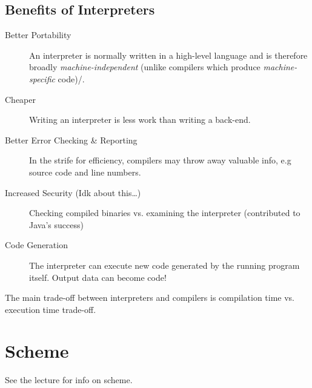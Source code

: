 \documentclass[11pt]{article}
\begin{document}
\subsection{Benefits of Interpreters}
\label{sec:orgc3ba5ed}
\begin{description}
\item[{Better Portability}] An interpreter is normally written in a high-level language and is therefore broadly \emph{machine-independent} (unlike compilers which produce \emph{machine-specific} code)/.
\item[{Cheaper}] Writing an interpreter is less work than writing a back-end.
\item[{Better Error Checking \& Reporting}] In the strife for efficiency, compilers may throw away valuable info, e.g source code and line numbers.
\item[{Increased Security (Idk about this\ldots{})}] Checking compiled binaries vs. examining the interpreter (contributed to Java's success)
\item[{Code Generation}] The interpreter can execute new code generated by the running program itself. Output data can become code!
\end{description}

The main trade-off between interpreters and compilers is compilation time vs. execution time trade-off.
\section{Scheme}
\label{sec:org1087e27}
See the lecture for info on scheme.
\end{document}

